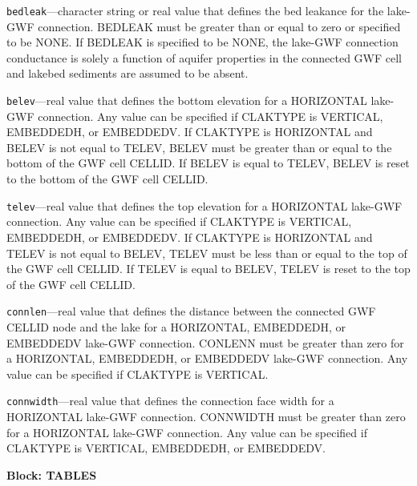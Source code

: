 \begin{description}
\item \texttt{bedleak}---character string or real value that defines the bed leakance for the lake-GWF connection. BEDLEAK must be greater than or equal to zero or specified to be NONE. If BEDLEAK is specified to be NONE, the lake-GWF connection conductance is solely a function of aquifer properties in the connected GWF cell and lakebed sediments are assumed to be absent.

\item \texttt{belev}---real value that defines the bottom elevation for a HORIZONTAL lake-GWF connection. Any value can be specified if CLAKTYPE is VERTICAL, EMBEDDEDH, or EMBEDDEDV. If CLAKTYPE is HORIZONTAL and BELEV is not equal to TELEV, BELEV must be greater than or equal to the bottom of the GWF cell CELLID. If BELEV is equal to TELEV, BELEV is reset to the bottom of the GWF cell CELLID.

\item \texttt{telev}---real value that defines the top elevation for a HORIZONTAL lake-GWF connection. Any value can be specified if CLAKTYPE is VERTICAL, EMBEDDEDH, or EMBEDDEDV. If CLAKTYPE is HORIZONTAL and TELEV is not equal to BELEV, TELEV must be less than or equal to the top of the GWF cell CELLID. If TELEV is equal to BELEV, TELEV is reset to the top of the GWF cell CELLID.

\item \texttt{connlen}---real value that defines the distance between the connected GWF CELLID node and the lake for a HORIZONTAL, EMBEDDEDH, or EMBEDDEDV lake-GWF connection. CONLENN must be greater than zero for a HORIZONTAL, EMBEDDEDH, or EMBEDDEDV lake-GWF connection. Any value can be specified if CLAKTYPE is VERTICAL.

\item \texttt{connwidth}---real value that defines the connection face width for a HORIZONTAL lake-GWF connection. CONNWIDTH must be greater than zero for a HORIZONTAL lake-GWF connection. Any value can be specified if CLAKTYPE is VERTICAL, EMBEDDEDH, or EMBEDDEDV.

\end{description}
\item \textbf{Block: TABLES}

